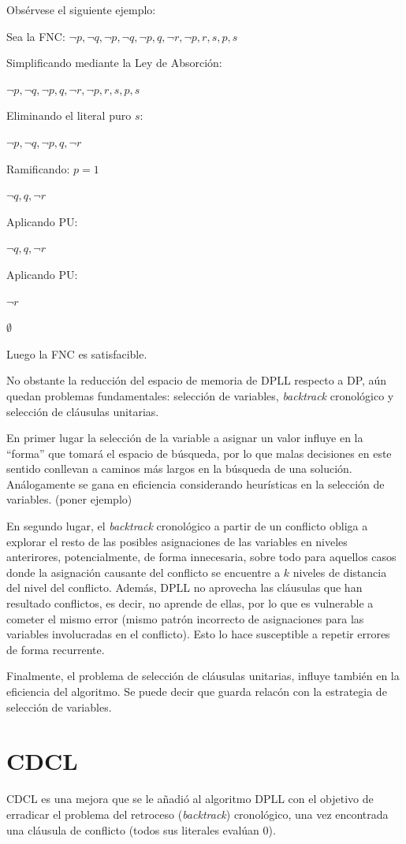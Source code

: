 Obsérvese el siguiente ejemplo:

Sea la FNC:
${{\neg p,\neg q},{\neg p, \neg q},{\neg p,q,\neg r},{\neg p,r,s},{p,s}}$

Simplificando mediante la Ley de Absorción:

${{\neg p,\neg q},{\neg p,q,\neg r},{\neg p,r,s},{p,s}}$

Eliminando el literal puro $s$:

${{\neg p,\neg q},{\neg p,q,\neg r}}$

Ramificando: $p=1$

${{\neg q},{q,\neg r}}$

Aplicando PU:

${{\neg q},{q,\neg r}}$

Aplicando PU:

${\neg r}$

$\emptyset$

Luego la FNC es satisfacible.

No obstante la reducción del espacio de memoria de DPLL respecto a DP, aún quedan problemas fundamentales: selección de variables, \textit{backtrack} cronológico y selección de cláusulas unitarias.

En primer lugar la selección de la variable a asignar un valor influye en la ``forma'' que tomará el espacio de búsqueda, por lo que malas decisiones en este sentido conllevan a caminos más largos en la búsqueda de una solución. Análogamente se gana en eficiencia considerando heurísticas en la selección de variables. (poner ejemplo)

En segundo lugar, el \textit{backtrack} cronológico a partir de un conflicto obliga a explorar el resto de las posibles asignaciones de las variables en niveles anterirores, potencialmente, de forma innecesaria, sobre todo para aquellos casos donde la asignación causante del conflicto se encuentre a $k$ niveles de distancia del nivel del conflicto. Además, DPLL no aprovecha las cláusulas que han resultado conflictos, es decir, no aprende de ellas, por lo que es vulnerable a cometer el mismo error (mismo patrón incorrecto de asignaciones para las variables involucradas en el conflicto). Esto lo hace susceptible a repetir errores de forma recurrente.

Finalmente, el problema de selección de cláusulas unitarias, influye también en la eficiencia del algoritmo. Se puede decir que guarda relacón con la estrategia de selección de variables.

\section{CDCL}
CDCL es una mejora que se le añadió al algoritmo DPLL con el objetivo de erradicar el problema del retroceso (\textit{backtrack}) cronológico, una vez encontrada una cláusula de conflicto (todos sus literales evalúan 0).

